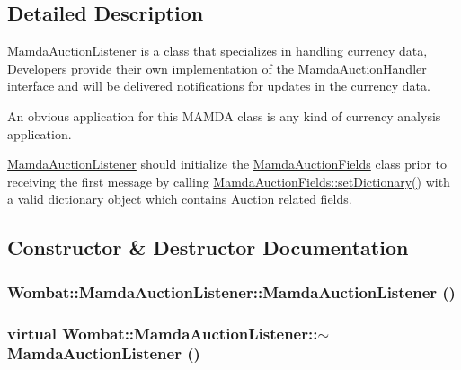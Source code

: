 \subsection{Detailed Description}
\hyperlink{classWombat_1_1MamdaAuctionListener}{Mamda\-Auction\-Listener} is a class that specializes in handling currency data, Developers provide their own implementation of the \hyperlink{classWombat_1_1MamdaAuctionHandler}{Mamda\-Auction\-Handler} interface and will be delivered notifications for updates in the currency data. 

An obvious application for this MAMDA class is any kind of currency analysis application.

\hyperlink{classWombat_1_1MamdaAuctionListener}{Mamda\-Auction\-Listener} should initialize the \hyperlink{classWombat_1_1MamdaAuctionFields}{Mamda\-Auction\-Fields} class prior to receiving the first message by calling \hyperlink{classWombat_1_1MamdaAuctionFields_04a03b13472ac525489f320e7dabf968}{Mamda\-Auction\-Fields::set\-Dictionary()} with a valid dictionary object which contains Auction related fields. 



\subsection{Constructor \& Destructor Documentation}
\hypertarget{classWombat_1_1MamdaAuctionListener_97294885eb3fd7da2a1db6bee9c7c781}{
\subsubsection[MamdaAuctionListener]{\setlength{\rightskip}{0pt plus 5cm}Wombat::Mamda\-Auction\-Listener::Mamda\-Auction\-Listener ()}}
\label{classWombat_1_1MamdaAuctionListener_97294885eb3fd7da2a1db6bee9c7c781}


\hypertarget{classWombat_1_1MamdaAuctionListener_fb100d7de6c0bf043d28922f7c425e6f}{
\subsubsection[$\sim$MamdaAuctionListener]{\setlength{\rightskip}{0pt plus 5cm}virtual Wombat::Mamda\-Auction\-Listener::$\sim$Mamda\-Auction\-Listener ()}}
\label{classWombat_1_1MamdaAuctionListener_fb100d7de6c0bf043d28922f7c425e6f}





